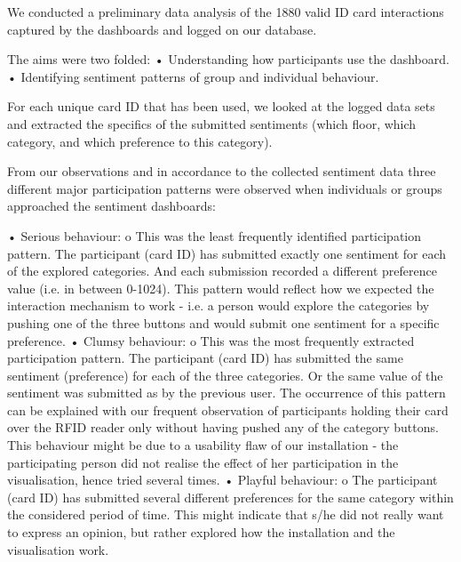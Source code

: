We conducted a preliminary data analysis of the 1880 valid ID card interactions captured by the dashboards and logged on our database. 

The aims were two folded:
•	Understanding how participants use the dashboard. 
•	Identifying sentiment patterns of group and individual behaviour.

For each unique card ID that has been used, we looked at the logged data sets and extracted the specifics of the submitted sentiments (which floor, which category, and which preference to this category). 

From our observations and in accordance to the collected sentiment data three different major participation patterns were observed when individuals or groups approached the sentiment dashboards: 

•	Serious behaviour:
o	This was the least frequently identified participation pattern. The participant (card ID) has submitted exactly one sentiment for each of the explored categories. And each submission recorded a different preference value (i.e. in between 0-1024). This pattern would reflect how we expected the interaction mechanism to work - i.e. a person would explore the categories by pushing one of the three buttons and would submit one sentiment for a specific preference. 
•	Clumsy behaviour: 
o	This was the most frequently extracted participation pattern. The participant (card ID) has submitted the same sentiment (preference) for each of the three categories. Or the same value of the sentiment was submitted as by the previous user. The occurrence of this pattern can be explained with our frequent observation of participants holding their card over the RFID reader only without having pushed any of the category buttons. This behaviour might be due to a usability flaw of our installation - the participating person did not realise the effect of her participation in the visualisation, hence tried several times. 
•	Playful behaviour: 
o	The participant (card ID) has submitted several different preferences for the same category within the considered period of time. This might indicate that s/he did not really want to express an opinion, but rather explored how the installation and the visualisation work. 

